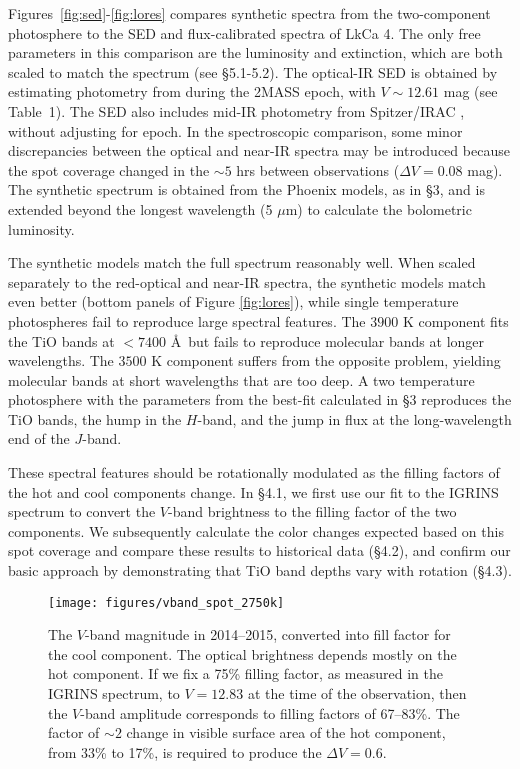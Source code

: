 \documentclass[twocolumn]{emulateapj}%
\begin{document}
Figures~\ref{fig:sed}-\ref{fig:lores} compares synthetic spectra from the two-component photosphere to the SED and flux-calibrated spectra of LkCa 4.  The only free parameters in this comparison are the luminosity and extinction, which are both scaled to match the spectrum (see \S 5.1-5.2).  The optical-IR SED is obtained by estimating photometry from \citet{grankin08} during the 2MASS epoch, with $V\sim12.61$ mag (see Table~1).  The SED also includes mid-IR photometry from Spitzer/IRAC \citep{hartmann05}, without adjusting for epoch.  In the spectroscopic comparison, some minor discrepancies between the optical and near-IR spectra may be introduced because the spot coverage changed in the $\sim 5$ hrs between observations ($\Delta V=0.08$ mag).  The synthetic spectrum is obtained from the Phoenix models, as in \S 3, and is extended beyond the longest wavelength (5 $\mu$m) to calculate the bolometric luminosity.

The synthetic models match the full spectrum reasonably well.  When scaled separately to the red-optical and near-IR spectra, the synthetic models match even better (bottom panels of Figure \ref{fig:lores}), while single temperature photospheres fail to reproduce large spectral features.   The $3900$ K component fits the TiO bands at $<7400$ \AA\ but fails to reproduce molecular bands at longer wavelengths.  The $3500$ K component suffers from the opposite problem, yielding molecular bands at short wavelengths that are too deep.  A two temperature photosphere with the parameters from the best-fit calculated in \S 3 reproduces the TiO bands, the hump in the $H$-band, and the jump in flux at the long-wavelength end of the $J$-band.

These spectral features should be rotationally modulated as the filling factors of the hot and cool components change.    In \S 4.1, we first use our fit to the IGRINS spectrum to convert the $V$-band brightness to the filling factor of the two components.  We subsequently calculate the color changes expected based on this spot coverage and compare these results to historical data (\S 4.2), and confirm our basic approach by demonstrating that TiO band depths vary with rotation (\S 4.3).



\begin{figure*}
 \centering
 \texttt{[image: figures/vband\_spot\_2750k]}
\caption{The $V$-band magnitude in 2014--2015, converted into fill factor for the cool component.  The optical brightness depends mostly on the hot component.  If we fix a 75\% filling factor, as measured in the IGRINS spectrum, to $V=12.83$ at the time of the observation, then the $V$-band amplitude  corresponds to filling factors of 67--83\%.  The factor of $\sim 2$ change in visible surface area of the hot component, from 33\% to 17\%, is required to produce the $\Delta V=0.6$. }
\label{fig:vband_spot}
\end{figure*}
\end{document}
